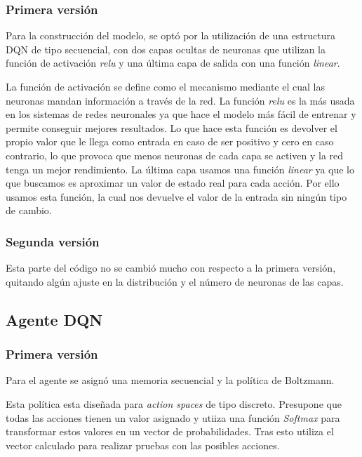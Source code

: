 \subsubsection{Primera versión}

Para la construcción del modelo, se optó por la utilización de una estructura DQN de tipo secuencial, con dos capas ocultas de neuronas que utilizan la función de activación \textit{relu} y una última capa de salida con una función \textit{linear}.

La función de activación se define como el mecanismo mediante el cual las neuronas mandan información a través de la red. La función \textit{relu} es la más usada en los sistemas de redes neuronales ya que hace el modelo más fácil de entrenar y permite conseguir mejores resultados.
Lo que hace esta función es devolver el propio valor que le llega como entrada en caso de ser positivo y cero en caso contrario, lo que provoca que menos neuronas de cada capa se activen y la red tenga un mejor rendimiento.
La última capa usamos una función \textit{linear} ya que lo que buscamos es aproximar un valor de estado real para cada acción. Por ello usamos esta función, la cual nos devuelve el valor de la entrada sin ningún tipo de cambio.

\subsubsection{Segunda versión}

Esta parte del código no se cambió mucho con respecto a la primera versión, quitando algún ajuste en la distribución y el número de neuronas de las capas.

\subsection{Agente DQN}

\subsubsection{Primera versión}

Para el agente se asignó una memoria secuencial y la política de Boltzmann\cite{wiki:Boltzmann}.

Esta política esta diseñada para \textit{action spaces} de tipo discreto. Presupone que todas las acciones tienen un valor asignado y utiiza una función \textit{Softmax} para transformar estos valores en un vector de probabilidades. Tras esto utiliza el vector calculado para realizar pruebas con las posibles acciones.

